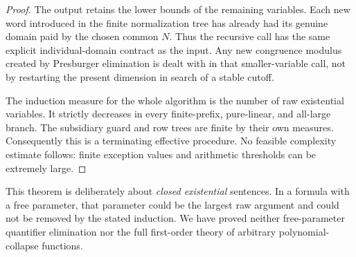 \begin{proof}
The output retains the lower bounds of the remaining variables.  Each
new word introduced in the finite normalization tree has already had
its genuine domain paid by the chosen common $N$.  Thus the recursive
call has the same explicit individual-domain contract as the input.
Any new congruence modulus created by Presburger elimination is dealt
with in that smaller-variable call, not by restarting the present
dimension in search of a stable cutoff.

The induction measure for the whole algorithm is the number of raw
existential variables. It strictly decreases in every finite-prefix,
pure-linear, and all-large branch. The subsidiary guard and row trees are
finite by their own measures. Consequently this is a terminating effective
procedure. No feasible complexity estimate follows: finite exception values
and arithmetic thresholds can be extremely large.
\end{proof}

This theorem is deliberately about \emph{closed existential} sentences.
In a formula with a free parameter, that parameter could be the largest raw
argument and could not be removed by the stated induction. We have proved
neither free-parameter quantifier elimination nor the full first-order
theory of arbitrary polynomial-collapse functions.

